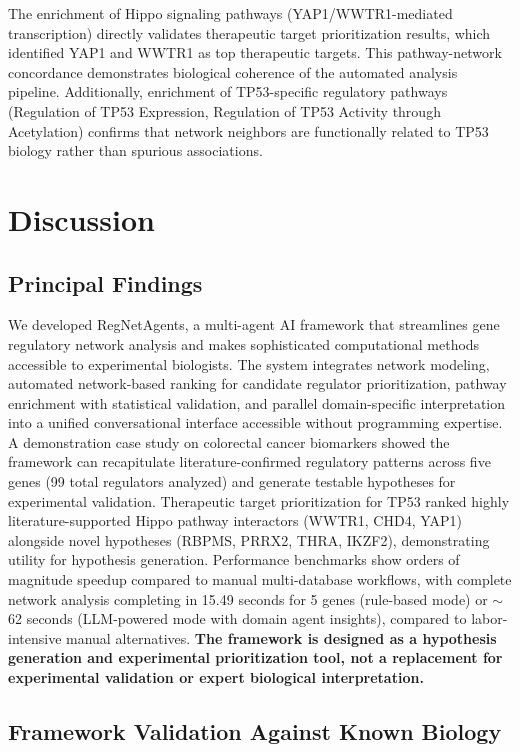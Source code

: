 \documentclass[11pt]{article}
\begin{document}
The enrichment of Hippo signaling pathways (YAP1/WWTR1-mediated transcription) directly validates therapeutic target prioritization results, which identified YAP1 and WWTR1 as top therapeutic targets. This pathway-network concordance demonstrates biological coherence of the automated analysis pipeline. Additionally, enrichment of TP53-specific regulatory pathways (Regulation of TP53 Expression, Regulation of TP53 Activity through Acetylation) confirms that network neighbors are functionally related to TP53 biology rather than spurious associations.

\section{Discussion}

\subsection{Principal Findings}

We developed RegNetAgents, a multi-agent AI framework that streamlines gene regulatory network analysis and makes sophisticated computational methods accessible to experimental biologists. The system integrates network modeling, automated network-based ranking for candidate regulator prioritization, pathway enrichment with statistical validation, and parallel domain-specific interpretation into a unified conversational interface accessible without programming expertise. A demonstration case study on colorectal cancer biomarkers showed the framework can recapitulate literature-confirmed regulatory patterns across five genes (99 total regulators analyzed) and generate testable hypotheses for experimental validation. Therapeutic target prioritization for TP53 ranked highly literature-supported Hippo pathway interactors (WWTR1, CHD4, YAP1) alongside novel hypotheses (RBPMS, PRRX2, THRA, IKZF2), demonstrating utility for hypothesis generation. Performance benchmarks show orders of magnitude speedup compared to manual multi-database workflows, with complete network analysis completing in 15.49 seconds for 5 genes (rule-based mode) or $\sim$62 seconds (LLM-powered mode with domain agent insights), compared to labor-intensive manual alternatives. \textbf{The framework is designed as a hypothesis generation and experimental prioritization tool, not a replacement for experimental validation or expert biological interpretation.}

\subsection{Framework Validation Against Known Biology}
\end{document}
